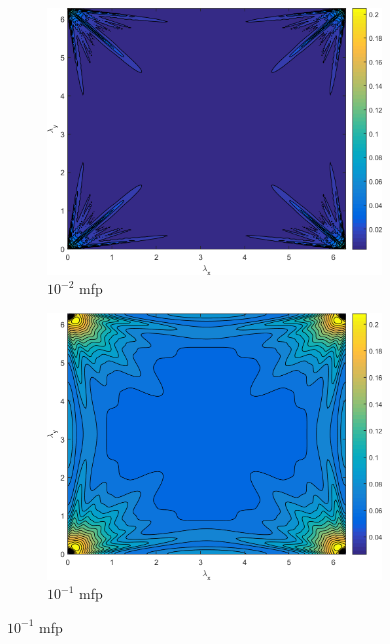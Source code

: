 \begin{figure}
\centering
	{
	\begin{subfigure}[b]{0.485\textwidth}
		\centering
		\includegraphics[width=0.975\textwidth]{figures/appendices/SI_M4S_UPWLD1_LS16_x=1e-2_dydx=1_contour.png}
		\caption{$10^{-2}$ mfp}
	\end{subfigure}
	\hfill
	\begin{subfigure}[b]{0.485\textwidth}
		\centering
		\includegraphics[width=0.975\textwidth]{figures/appendices/SI_M4S_UPWLD1_LS16_x=1e-1_dydx=1_contour.png}
		\caption{$10^{-1}$ mfp}
	\end{subfigure}
	}
	\vspace{0.5cm}

\end{figure}
